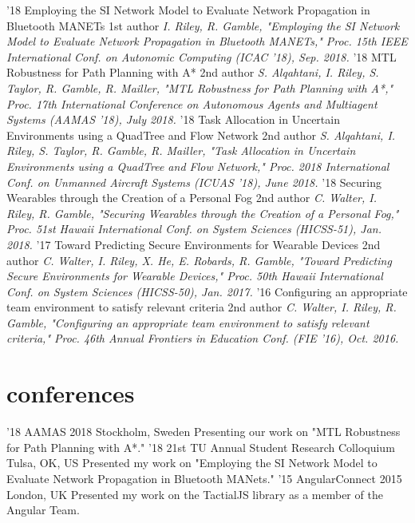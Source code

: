 \documentclass[print]{friggeri-cv}
\begin{document}
    \begin{entrylist}
      \entry
        {'18}
        {Employing the SI Network Model to Evaluate Network Propagation in Bluetooth MANETs}
        {1st author}
        {\textit{I. Riley, R. Gamble, "Employing the SI Network Model to Evaluate Network Propagation in Bluetooth MANETs," Proc. 15th IEEE International Conf. on Autonomic Computing (ICAC '18), Sep. 2018.}}
      \entry
        {'18}
        {MTL Robustness for Path Planning with A*}
        {2nd author}
        {\textit{S. Alqahtani, I. Riley, S. Taylor, R. Gamble, R. Mailler, "MTL Robustness for Path Planning with A*," Proc. 17th International Conference on Autonomous Agents and Multiagent Systems (AAMAS '18), July 2018.}}
      \entry
        {'18}
        {Task Allocation in Uncertain Environments using a QuadTree and Flow Network}
        {2nd author}
        {\textit{S. Alqahtani, I. Riley, S. Taylor, R. Gamble, R. Mailler, "Task Allocation in Uncertain Environments using a QuadTree and Flow Network," Proc. 2018 International Conf. on Unmanned Aircraft Systems (ICUAS '18), June 2018.}}
      \entry
        {'18}
        {Securing Wearables through the Creation of a Personal Fog}
        {2nd author}
        {\textit{C. Walter, I. Riley, R. Gamble, "Securing Wearables through the Creation of a Personal Fog," Proc. 51st Hawaii International Conf. on System Sciences (HICSS-51), Jan. 2018.}}
      \entry
        {'17}
        {Toward Predicting Secure Environments for Wearable Devices}
        {2nd author}
        {\textit{C. Walter, I. Riley, X. He, E. Robards, R. Gamble, "Toward Predicting Secure Environments for Wearable Devices," Proc. 50th Hawaii International Conf. on System Sciences (HICSS-50), Jan. 2017.}}
      \entry
        {'16}
        {Configuring an appropriate team environment to satisfy relevant criteria}
        {2nd author}
        {\textit{C. Walter, I. Riley, R. Gamble, "Configuring an appropriate team environment to satisfy relevant criteria," Proc. 46th Annual Frontiers in Education Conf. (FIE '16), Oct. 2016.}}
    \end{entrylist}

  \section{conferences}

    \begin{entrylist}
      \entry
        {'18}
        {AAMAS 2018}
        {Stockholm, Sweden}
        {Presenting our work on "MTL Robustness for Path Planning with A*."}
      \entry
        {'18}
        {21st TU Annual Student Research Colloquium}
        {Tulsa, OK, US}
        {Presented my work on "Employing the SI Network Model to Evaluate Network Propagation in Bluetooth MANets."}
      \entry
        {'15}
        {AngularConnect 2015}
        {London, UK}
        {Presented my work on the TactialJS library as a member of the Angular Team.}
    \end{entrylist}
\end{document}
